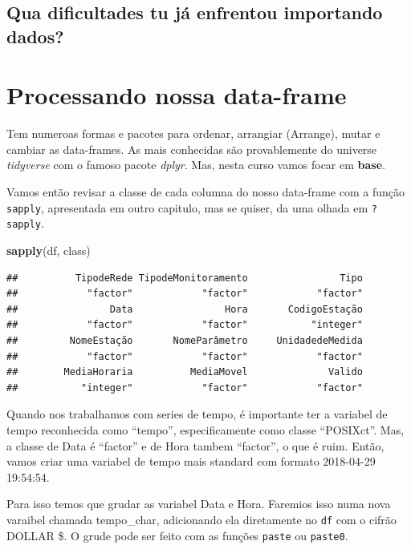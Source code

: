 \documentclass[]{book}
\newenvironment{Shaded}{\begin{snugshade}}{\end{snugshade}}
\newcommand{\KeywordTok}[1]{\textcolor[rgb]{0.13,0.29,0.53}{\textbf{#1}}}
\newcommand{\NormalTok}[1]{#1}
\theoremstyle{definition}
\theoremstyle{definition}
\theoremstyle{definition}
\theoremstyle{remark}
\begin{document}
\subsection{Qua dificultades tu já enfrentou importando
dados?}\label{qua-dificultades-tu-ja-enfrentou-importando-dados}

\section{Processando nossa
data-frame}\label{processando-nossa-data-frame}

Tem numeroas formas e pacotes para ordenar, arrangiar (Arrange), mutar e
cambiar as data-frames. As mais conhecidas são provablemente do universe
\emph{tidyverse} com o famoso pacote \emph{dplyr}. Mas, nesta curso
vamos focar em \textbf{base}.

Vamos então revisar a classe de cada columna do nosso data-frame com a
função \texttt{sapply}, apresentada em outro capitulo, mas se quiser, da
uma olhada em \texttt{?sapply}.

\begin{Shaded}
\begin{Highlighting}[]
\KeywordTok{sapply}\NormalTok{(df, class)}
\end{Highlighting}
\end{Shaded}

\begin{verbatim}
##          TipodeRede TipodeMonitoramento                Tipo 
##            "factor"            "factor"            "factor" 
##                Data                Hora       CodigoEstação 
##            "factor"            "factor"           "integer" 
##         NomeEstação       NomeParâmetro     UnidadedeMedida 
##            "factor"            "factor"            "factor" 
##        MediaHoraria          MediaMovel              Valido 
##           "integer"            "factor"            "factor"
\end{verbatim}

Quando nos trabalhamos com series de tempo, é importante ter a variabel
de tempo reconhecida como ``tempo'', especificamente como classe
``POSIXct''. Mas, a classe de Data é ``factor'' e de Hora tambem
``factor'', o que é ruim. Então, vamos criar uma variabel de tempo mais
standard com formato 2018-04-29 19:54:54.

Para isso temos que grudar as variabel Data e Hora. Faremios isso numa
nova varaibel chamada tempo\_char, adicionando ela diretamente no
\texttt{df} com o cifrão DOLLAR \$. O grude pode ser feito com as
funções \texttt{paste} ou \texttt{paste0}.
\end{document}
